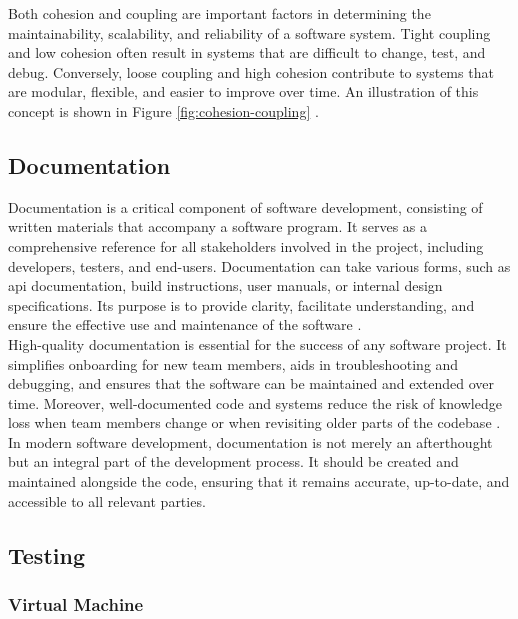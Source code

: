 {Both cohesion and coupling are important factors in determining the maintainability, scalability, and reliability of a software system. Tight coupling and low cohesion often result in systems that are difficult to change, test, and debug. Conversely, loose coupling and high cohesion contribute to systems that are modular, flexible, and easier to improve over time. An illustration of this concept is shown in Figure \ref{fig:cohesion-coupling} \cite{geeksforgeeks:c&c}.

\newpage

\subsection{Documentation}
\label{subsec:documentation}

Documentation is a critical component of software development, consisting of written materials that accompany a software program. It serves as a comprehensive reference for all stakeholders involved in the project, including developers, testers, and end-users. Documentation can take various forms, such as \gls{api} documentation, build instructions, user manuals, or internal design specifications. Its purpose is to provide clarity, facilitate understanding, and ensure the effective use and maintenance of the software \cite{geeksforgeeks:doc}. \\

High-quality documentation is essential for the success of any software project. It simplifies onboarding for new team members, aids in troubleshooting and debugging, and ensures that the software can be maintained and extended over time. Moreover, well-documented code and systems reduce the risk of knowledge loss when team members change or when revisiting older parts of the codebase \cite{geeksforgeeks:doc}. \\

In modern software development, documentation is not merely an afterthought but an integral part of the development process. It should be created and maintained alongside the code, ensuring that it remains accurate, up-to-date, and accessible to all relevant parties.

\subsection{Testing}
\label{subsec:testing}

\subsubsection*{Virtual Machine}
\label{subsubsec:virtual-machine}

}
